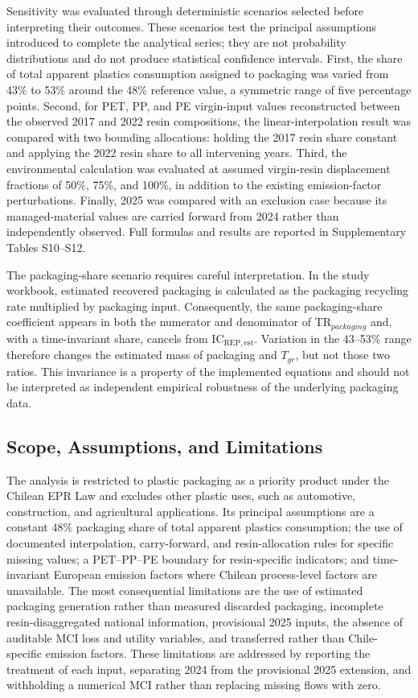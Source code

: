 \documentclass[review,10pt]{elsarticle}
\newcommand{\revpar}[1]{#1\par\medskip}
\newcommand{\changepar}[1]{#1\par\medskip}
\begin{document}
\revpar{Sensitivity was evaluated through deterministic scenarios selected before interpreting their outcomes. These scenarios test the principal assumptions introduced to complete the analytical series; they are not probability distributions and do not produce statistical confidence intervals. First, the share of total apparent plastics consumption assigned to packaging was varied from 43\% to 53\% around the 48\% reference value, a symmetric range of five percentage points. Second, for PET, PP, and PE virgin-input values reconstructed between the observed 2017 and 2022 resin compositions, the linear-interpolation result was compared with two bounding allocations: holding the 2017 resin share constant and applying the 2022 resin share to all intervening years. Third, the environmental calculation was evaluated at assumed virgin-resin displacement fractions of 50\%, 75\%, and 100\%, in addition to the existing emission-factor perturbations. Finally, 2025 was compared with an exclusion case because its managed-material values are carried forward from 2024 rather than independently observed. Full formulas and results are reported in Supplementary Tables S10--S12.}

\revpar{The packaging-share scenario requires careful interpretation. In the study workbook, estimated recovered packaging is calculated as the packaging recycling rate multiplied by packaging input. Consequently, the same packaging-share coefficient appears in both the numerator and denominator of TR$_{packaging}$ and, with a time-invariant share, cancels from IC$_{\mathrm{REP,est}}$. Variation in the 43--53\% range therefore changes the estimated mass of packaging and $T_{gr}$, but not those two ratios. This invariance is a property of the implemented equations and should not be interpreted as independent empirical robustness of the underlying packaging data.}

\subsection{Scope, Assumptions, and Limitations}

\changepar{The analysis is restricted to plastic packaging as a priority product under the Chilean EPR Law and excludes other plastic uses, such as automotive, construction, and agricultural applications. Its principal assumptions are a constant 48\% packaging share of total apparent plastics consumption; the use of documented interpolation, carry-forward, and resin-allocation rules for specific missing values; a PET--PP--PE boundary for resin-specific indicators; and time-invariant European emission factors where Chilean process-level factors are unavailable. The most consequential limitations are the use of estimated packaging generation rather than measured discarded packaging, incomplete resin-disaggregated national information, provisional 2025 inputs, the absence of auditable MCI loss and utility variables, and transferred rather than Chile-specific emission factors. These limitations are addressed by reporting the treatment of each input, separating 2024 from the provisional 2025 extension, and withholding a numerical MCI rather than replacing missing flows with zero.}
\end{document}
